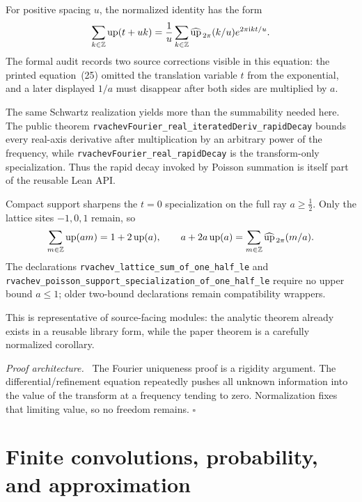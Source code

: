 \documentclass[11pt,oneside]{article}
\theoremstyle{definition}
\theoremstyle{remark}
\newenvironment{proofidea}{\par\smallskip\noindent\textit{Proof architecture.}\ }{\hfill$\square$\par\smallskip}
\begin{document}
For positive spacing \(u\), the normalized identity has the form
\[
  \sum_{k\in\mathbb{Z}}\operatorname{up}(t+uk)
  =\frac1u\sum_{k\in\mathbb{Z}}
    \widehat{\operatorname{up}}_{\,2\pi}(k/u)e^{2\pi\mathrm{i} kt/u}.
\]
The formal audit records two source corrections visible in this equation: the
printed equation~(25) omitted the translation variable \(t\) from the
exponential, and a later displayed \(1/a\) must disappear after both sides are
multiplied by \(a\).

The same Schwartz realization yields more than the summability needed here.
The public theorem \nolinkurl{rvachevFourier_real_iteratedDeriv_rapidDecay} bounds
every real-axis derivative after multiplication by an arbitrary power of the
frequency, while \nolinkurl{rvachevFourier_real_rapidDecay} is the transform-only
specialization.  Thus the rapid decay invoked by Poisson summation is itself
part of the reusable Lean API.

Compact support sharpens the \(t=0\) specialization on the full ray
\(a\geq\tfrac12\).  Only the lattice sites \(-1,0,1\) remain, so
\[
  \sum_{m\in\mathbb{Z}}\operatorname{up}(am)=1+2\operatorname{up}(a),
  \qquad
  a+2a\operatorname{up}(a)=\sum_{m\in\mathbb{Z}}\widehat{\operatorname{up}}_{\,2\pi}(m/a).
\]
The declarations \nolinkurl{rvachev_lattice_sum_of_one_half_le} and
\nolinkurl{rvachev_poisson_support_specialization_of_one_half_le} require no
upper bound \(a\leq1\); older two-bound declarations remain compatibility
wrappers.

This is representative of source-facing modules: the analytic theorem already exists in a reusable library form, while the paper theorem is a carefully normalized corollary.

\begin{proofidea}
The Fourier uniqueness proof is a rigidity argument.  The differential/refinement equation repeatedly pushes all unknown information into the value of the transform at a frequency tending to zero.  Normalization fixes that limiting value, so no freedom remains.
\end{proofidea}

\section{Finite convolutions, probability, and approximation}\label{ch:probability}
\end{document}
